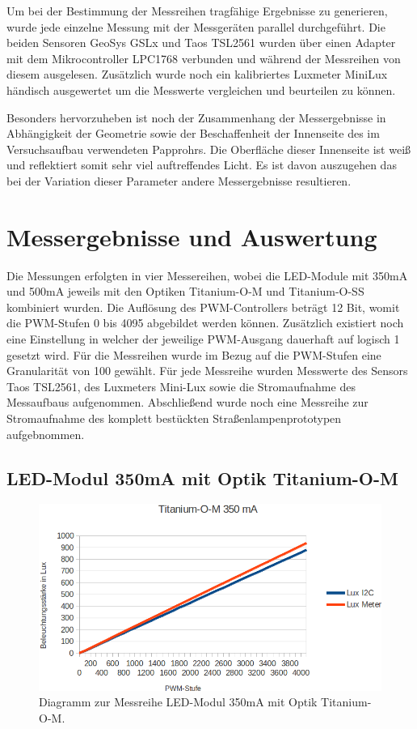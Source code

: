 \documentclass[a4paper,12pt]{scrartcl}
\begin{document}
Um bei der Bestimmung der Messreihen tragfähige Ergebnisse zu generieren, wurde jede einzelne Messung mit der Messgeräten parallel durchgeführt. Die beiden
Sensoren GeoSys GSLx und Taos TSL2561 wurden über einen Adapter mit dem Mikrocontroller LPC1768 verbunden und während der Messreihen von diesem ausgelesen.
Zusätzlich wurde noch ein kalibriertes Luxmeter MiniLux händisch ausgewertet um die Messwerte vergleichen und beurteilen zu können. 

Besonders hervorzuheben ist noch der Zusammenhang der Messergebnisse in Abhängigkeit der Geometrie sowie der Beschaffenheit der Innenseite des im Versuchsaufbau
verwendeten Papprohrs. Die Oberfläche dieser Innenseite ist weiß und reflektiert somit sehr viel auftreffendes Licht. Es ist davon auszugehen das bei der
Variation dieser Parameter andere Messergebnisse resultieren.

\clearpage
\section{Messergebnisse und Auswertung}
Die Messungen erfolgten in vier Messereihen, wobei die LED-Module mit 350mA und 500mA jeweils mit den Optiken Titanium-O-M und Titanium-O-SS kombiniert wurden.
Die Auflösung des PWM-Controllers beträgt 12 Bit, womit die PWM-Stufen 0 bis 4095 abgebildet werden können. Zusätzlich existiert noch eine Einstellung in
welcher der jeweilige PWM-Ausgang dauerhaft auf logisch 1 gesetzt wird. Für die Messreihen wurde im Bezug auf die PWM-Stufen eine Granularität von 100 gewählt.
Für jede Messreihe wurden Messwerte  des Sensors Taos TSL2561, des Luxmeters Mini-Lux sowie die Stromaufnahme des Messaufbaus aufgenommen.
Abschließend wurde noch eine Messreihe zur Stromaufnahme des komplett bestückten Straßenlampenprototypen aufgebnommen.

\subsection{LED-Modul 350mA mit Optik Titanium-O-M}

\begin{figure}[H]
  \begin{center}
    \includegraphics[width=1\hsize]{./images/350-m-print.png}
  \end{center}
\caption[Diagramm zur Messreihe LED-Modul 350mA mit Optik Titanium-O-M]{\label{diagram350matitm}Diagramm zur Messreihe LED-Modul 350mA mit Optik
Titanium-O-M.}
\end{figure}
\end{document}
